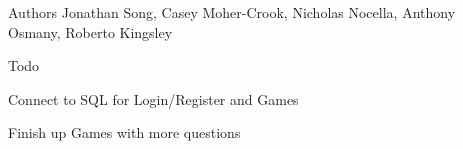 \begin{DoxyAuthor}{Authors}
Jonathan Song, Casey Moher-\/\+Crook, Nicholas Nocella, Anthony Osmany, Roberto Kingsley
\end{DoxyAuthor}
\begin{DoxyRefDesc}{Todo}
\item[{\bf Todo}]Connect to S\+Q\+L for Login/\+Register and Games 

Finish up Games with more questions \end{DoxyRefDesc}
